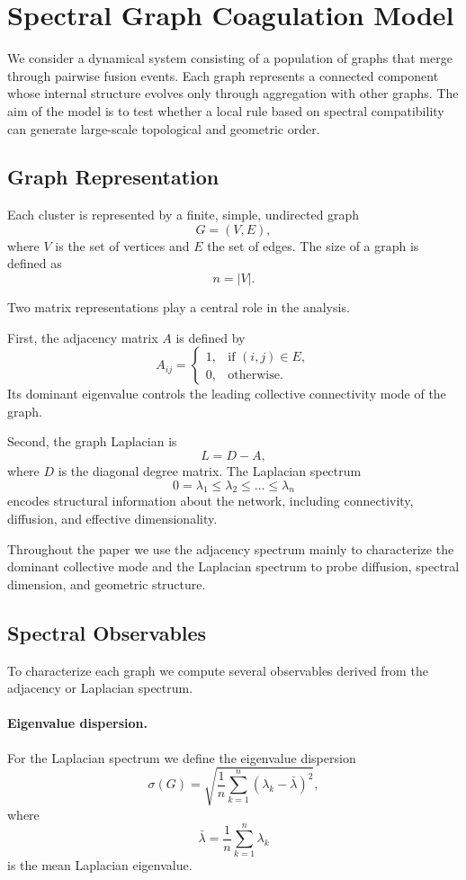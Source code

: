 \documentclass[11pt]{article}
\begin{document}
\section{Spectral Graph Coagulation Model}

We consider a dynamical system consisting of a population of graphs that merge through pairwise fusion events.
Each graph represents a connected component whose internal structure evolves only through aggregation with other graphs.
The aim of the model is to test whether a local rule based on spectral compatibility can generate large-scale topological and geometric order.

\subsection{Graph Representation}

Each cluster is represented by a finite, simple, undirected graph
\[
G = (V,E),
\]
where $V$ is the set of vertices and $E$ the set of edges.
The size of a graph is defined as
\[
n = |V|.
\]

Two matrix representations play a central role in the analysis.

First, the adjacency matrix $A$ is defined by
\[
A_{ij}=
\begin{cases}
1,& \text{if } (i,j)\in E,\\
0,& \text{otherwise}.
\end{cases}
\]
Its dominant eigenvalue controls the leading collective connectivity mode of the graph.

Second, the graph Laplacian is
\[
L = D - A,
\]
where $D$ is the diagonal degree matrix.
The Laplacian spectrum
\[
0 = \lambda_1 \le \lambda_2 \le \dots \le \lambda_n
\]
encodes structural information about the network, including connectivity, diffusion, and effective dimensionality.

Throughout the paper we use the adjacency spectrum mainly to characterize the dominant collective mode and the Laplacian spectrum to probe diffusion, spectral dimension, and geometric structure.

\subsection{Spectral Observables}

To characterize each graph we compute several observables derived from the adjacency or Laplacian spectrum.

\paragraph{Eigenvalue dispersion.}
For the Laplacian spectrum we define the eigenvalue dispersion
\[
\sigma(G) = \sqrt{\frac{1}{n}\sum_{k=1}^{n} (\lambda_k-\bar{\lambda})^2},
\]
where
\[
\bar{\lambda}=\frac{1}{n}\sum_{k=1}^{n}\lambda_k
\]
is the mean Laplacian eigenvalue.
\end{document}
